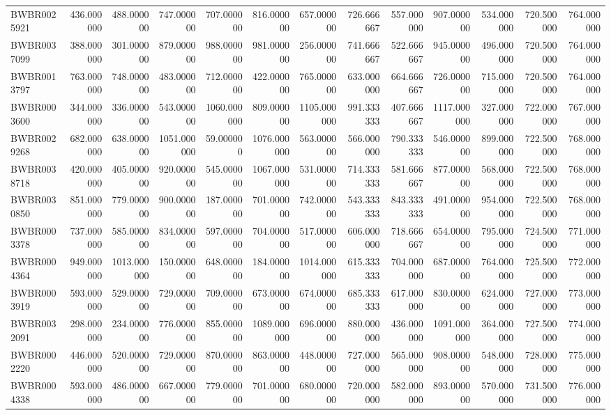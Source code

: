 \begin{longtable}{lrrrrrrrrrrrr}
BWBR0025921 & 436.000000 & 488.000000 & 747.000000 & 707.000000 & 816.000000 & 657.000000 & 726.666667 & 557.000000 & 907.000000 & 534.000000 & 720.500000 & 764.000000 \\
BWBR0037099 & 388.000000 & 301.000000 & 879.000000 & 988.000000 & 981.000000 & 256.000000 & 741.666667 & 522.666667 & 945.000000 & 496.000000 & 720.500000 & 764.000000 \\
BWBR0013797 & 763.000000 & 748.000000 & 483.000000 & 712.000000 & 422.000000 & 765.000000 & 633.000000 & 664.666667 & 726.000000 & 715.000000 & 720.500000 & 764.000000 \\
BWBR0003600 & 344.000000 & 336.000000 & 543.000000 & 1060.000000 & 809.000000 & 1105.000000 & 991.333333 & 407.666667 & 1117.000000 & 327.000000 & 722.000000 & 767.000000 \\
BWBR0029268 & 682.000000 & 638.000000 & 1051.000000 & 59.000000 & 1076.000000 & 563.000000 & 566.000000 & 790.333333 & 546.000000 & 899.000000 & 722.500000 & 768.000000 \\
BWBR0038718 & 420.000000 & 405.000000 & 920.000000 & 545.000000 & 1067.000000 & 531.000000 & 714.333333 & 581.666667 & 877.000000 & 568.000000 & 722.500000 & 768.000000 \\
BWBR0030850 & 851.000000 & 779.000000 & 900.000000 & 187.000000 & 701.000000 & 742.000000 & 543.333333 & 843.333333 & 491.000000 & 954.000000 & 722.500000 & 768.000000 \\
BWBR0003378 & 737.000000 & 585.000000 & 834.000000 & 597.000000 & 704.000000 & 517.000000 & 606.000000 & 718.666667 & 654.000000 & 795.000000 & 724.500000 & 771.000000 \\
BWBR0004364 & 949.000000 & 1013.000000 & 150.000000 & 648.000000 & 184.000000 & 1014.000000 & 615.333333 & 704.000000 & 687.000000 & 764.000000 & 725.500000 & 772.000000 \\
BWBR0003919 & 593.000000 & 529.000000 & 729.000000 & 709.000000 & 673.000000 & 674.000000 & 685.333333 & 617.000000 & 830.000000 & 624.000000 & 727.000000 & 773.000000 \\
BWBR0032091 & 298.000000 & 234.000000 & 776.000000 & 855.000000 & 1089.000000 & 696.000000 & 880.000000 & 436.000000 & 1091.000000 & 364.000000 & 727.500000 & 774.000000 \\
BWBR0002220 & 446.000000 & 520.000000 & 729.000000 & 870.000000 & 863.000000 & 448.000000 & 727.000000 & 565.000000 & 908.000000 & 548.000000 & 728.000000 & 775.000000 \\
BWBR0004338 & 593.000000 & 486.000000 & 667.000000 & 779.000000 & 701.000000 & 680.000000 & 720.000000 & 582.000000 & 893.000000 & 570.000000 & 731.500000 & 776.000000 \\

\end{longtable}
